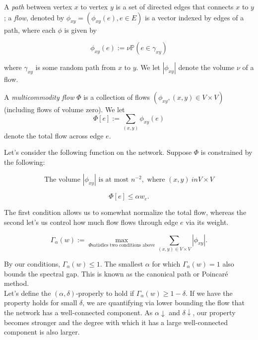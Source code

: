 \begin{definition}
A \textit{path} between vertex $x$ to vertex $y$ is a set of directed edges that connects $x$ to $y$; a \textit{flow}, denoted by $\phi_{xy} = (\phi_{xy}(e), e \in E)$ is a vector indexed by edges of a path, where each $\phi$ is given by 

$$\phi_{xy}(e) := \nu \mathbb{P}(e\in \gamma_{xy}) $$

where $\gamma_{xy}$ is some random path from $x$ to $y$.  We let $|\phi_{xy}|$ denote the volume $\nu$ of a flow.  
\end{definition}

\begin{definition}


A \textit{multicommodity flow} $\Phi$ is a collection of flows $  (\phi_{xy}, (x,y) \in V \times V)$ (including flows of volume zero).  We let $$ \Phi[e] := \sum_{(x,y)}\phi_{xy}(e)$$ denote the total flow across edge $e$.  

\end{definition}
Let's consider the following function on the network.  Suppose $\Phi$ is constrained by the following:

\begin{equation}
\text{The volume } |\phi_{xy}| \text{ is at most }n^{-2}, \text{ where }(x,y) \ in V\times V
\end{equation}

\begin{equation}
\Phi[e] \leq \alpha w_e.
\end{equation}

The first condition allows us to somewhat normalize the total flow, whereas the second let's us control how much flow flows through edge $e$ via its weight.  

\begin{definition}
$$\Gamma_{\alpha}(w) := \max_{\Phi \text{satisfies two conditions above}}\sum_{(x,y)\in V\times V} |\phi_{xy}|.$$
\end{definition}

By our conditions, $\Gamma_{\alpha}(w) \leq 1$. The smallest $\alpha$ for which $\Gamma_{\alpha}(w) = 1$ also bounds the spectral gap. This is known as the canonical path or Poincar\'e method\cite{persi}.\\

Let's define the $(\alpha, \delta)$-properly to hold if $\Gamma_{\alpha}(w) \geq 1 - \delta$.  If we have the property holds for small $\delta$, we are quantifying via lower bounding the flow that the network has a well-connected component. As $\alpha \downarrow$ and $\delta \downarrow$, our property becomes stronger and the degree with which it has a large well-connected component is also larger. 

